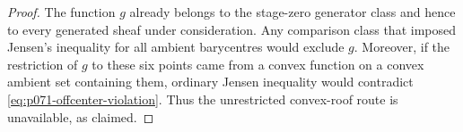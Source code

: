 \begin{proof}
The function $g$ already belongs to the stage-zero generator class and
hence to every generated sheaf under consideration.  Any comparison class
that imposed Jensen's inequality for all ambient barycentres would exclude
$g$.  Moreover, if the restriction of $g$ to these six points came from a
convex function on a convex ambient set containing them, ordinary Jensen
inequality would contradict \eqref{eq:p071-offcenter-violation}.  Thus the
unrestricted convex-roof route is unavailable, as claimed.
\end{proof}

